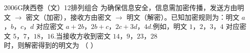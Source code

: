 
\begin{problem}{2006}{G}{陕西卷（文）}{12}{排列组合}
为确保信息安全，信息需加密传播，发送方由明文 $ \to $ 密文（加密），接收方由密文 $ \to $ 明文（解密）。已知加密规则为：明文 $ a $，$ b $，$ c $，$ d $ 对应密文 $ a + 2b $，$ 2b + c $，$ 2c + 3d $，$ 4d $.例如，明文 $ 1 $，$ 2 $，$ 3 $，$ 4 $ 对应密文 $ 5 $，$ 7 $，$ 18 $，$ 16 $.当接收方收到密文 $ 14 $，$ 9 $，$ 23 $，$ 28 $ 时，则解密得到的明文为 （ ）
\begin{choices}
\end{choices}
\end{problem}

\begin{answer}

\end{answer}

\begin{solutions}

\end{solutions}